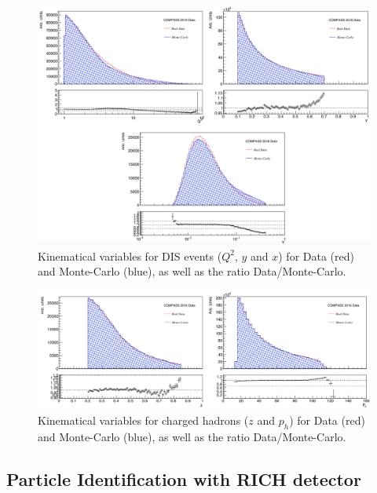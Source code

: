\documentclass[letterpaper,12pt]{article}
\begin{document}
\hspace*{0mm}\vfill
\begin{figure}[!h]
	\includegraphics[scale=0.5]{./gfx/DIS_kin.png}
	\caption{Kinematical variables for DIS events ($Q^2$, $y$ and $x$) for Data (red) and Monte-Carlo (blue), as well as the ratio Data/Monte-Carlo.}
	\label{DISkin}
\end{figure}
\vfill\hspace*{0mm}

\newpage

\hspace*{0mm}\vfill
\begin{figure}[!h]
	\includegraphics[scale=0.5]{./gfx/SIDIS_kin.png}
	\caption{Kinematical variables for charged hadrons ($z$ and $p_h$) for Data (red) and Monte-Carlo (blue), as well as the ratio Data/Monte-Carlo.}
	\label{SIDISkin}
\end{figure}
\vfill\hspace*{0mm}

\newpage

\subsection{Particle Identification with RICH detector}
\end{document}
